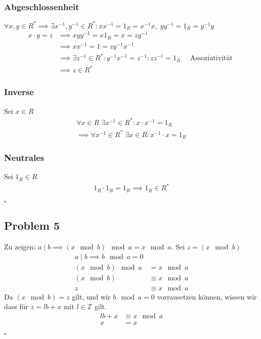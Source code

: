 \documentclass[12pt, german]{article}
\newcommand{\bewiesen}{\begin{flushright}$\square$ \end{flushright} }
\begin{document}
    	\subsubsection*{Abgeschlossenheit}
    	 $\forall  x,y \in R^\ast \implies \exists x^{-1}, y^{-1} \in R^\ast : xx^{-1} = 1_R = x^{-1}x, \; yy^{-1} = 1_R = y^{-1}y $
    	\begin{align*}
    		x \cdot y = z &\implies xyy^{-1} = x1_R=x=zy^{-1} \\
    		&\implies xx^{-1} = 1 = zy^{-1}x^{-1} \\
    		&\implies \exists z^{-1} \in R^\ast : y^{-1}x^{-1} = z^{-1} : zz^{-1} = 1_R  \quad \text{ Assoziativität }\\
    			&\implies z \in R^\ast
    	\end{align*} 
    	\subsubsection*{Inverse}
    	Sei $x \in R$ 
    		\begin{align*} 
    		 \forall  x \in R \; \exists x^{-1} \in R^\ast : x\cdot x^{-1} = 1_R  \\
    		 \implies \forall x^{-1} \in R^\ast \; \exists x \in R : x^{-1} \cdot x = 1_R
    	\end{align*} 
    	
    	\subsubsection*{Neutrales}
    		Sei $1_R \in R$ 
    		\begin{align*}
    			1_R \cdot 1_R = 1_R \implies 1_R \in R^\ast
    	\end{align*} \bewiesen
   
    \subsection*{Problem 5}
    Zu zeigen: 	$a \mid b \implies (x \mod b) \mod a = x \mod a $. Sei $z =(x \mod b)$ 
    \begin{align*}
    	a \mid b \implies b \mod a = 0 \\
    	(x \mod b) \mod a &= x \mod a  \\
    	(x \mod b) &\equiv x \mod a \\ 
		z &\equiv x \mod a     
    \end{align*}
    Da $(x \mod b) = z$  gilt, und wir $b \mod a = 0$ vorrausetzen können, wissen wir dass für $z = lb + x$ mit $l \in \mathbb{Z}$ gilt. 
    \begin{align*}
    lb + x &\equiv x \mod a     \\
     x &= x
    \end{align*} \bewiesen
    \newpage
\end{document}
